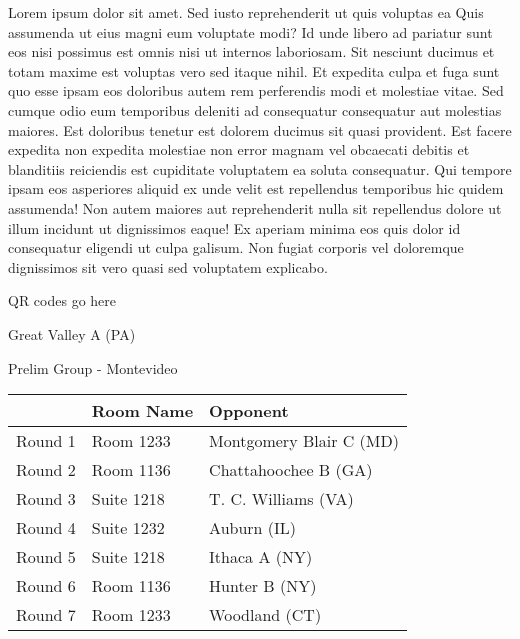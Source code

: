\documentclass{article}%
\begin{document}
\vspace*{8pt}%
\linebreak%
\newline%
\newline%
Lorem ipsum dolor sit amet. Sed iusto reprehenderit ut quis voluptas ea Quis assumenda ut eius magni eum voluptate modi? Id unde libero ad pariatur sunt eos nisi possimus est omnis nisi ut internos laboriosam. Sit nesciunt ducimus et totam maxime est voluptas vero sed itaque nihil. Et expedita culpa et fuga sunt quo esse ipsam eos doloribus autem rem perferendis modi et molestiae vitae.\newline%
\newline%
Sed cumque odio eum temporibus deleniti ad consequatur consequatur aut molestias maiores. Est doloribus tenetur est dolorem ducimus sit quasi provident. Est facere expedita non expedita molestiae non error magnam vel obcaecati debitis et blanditiis reiciendis est cupiditate voluptatem ea soluta consequatur. Qui tempore ipsam eos asperiores aliquid ex unde velit est repellendus temporibus hic quidem assumenda!\newline%
\newline%
Non autem maiores aut reprehenderit nulla sit repellendus dolore ut illum incidunt ut dignissimos eaque! Ex aperiam minima eos quis dolor id consequatur eligendi ut culpa galisum. Non fugiat corporis vel doloremque dignissimos sit vero quasi sed voluptatem explicabo.\newline%
\newline%
%
\vspace*{30pt}%
\begin{center}%
\begin{Huge}%
QR codes go here%
\end{Huge}%
\end{center}%
\newpage%
%
\begin{center}%
\begin{Huge}%
Great Valley A (PA)%
\end{Huge}%
\vspace*{8pt}%
\linebreak%
\begin{Large}%
Prelim Group {-} Montevideo%
\end{Large}%
\end{center}%
\begin{tabularx}{\textwidth}{|c|Y|Y|}%
\hline%
&Room Name&Opponent\\%
\hline%
Round 1&Room 1233&Montgomery Blair C (MD)\\%
Round 2&Room 1136&Chattahoochee B (GA)\\%
Round 3&Suite 1218&T. C. Williams (VA)\\%
Round 4&Suite 1232&Auburn (IL)\\%
Round 5&Suite 1218&Ithaca A (NY)\\%
Round 6&Room 1136&Hunter B (NY)\\%
Round 7&Room 1233&Woodland (CT)\\%
\hline%
\end{tabularx}%
\end{document}
